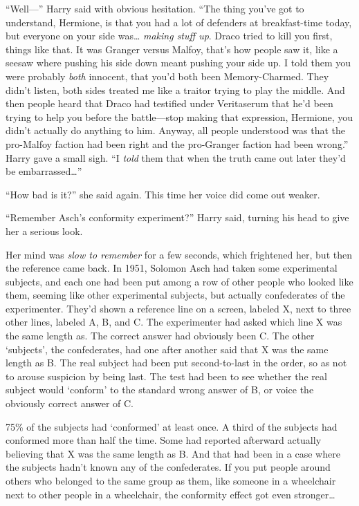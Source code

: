 ``Well---'' Harry said with obvious hesitation. ``The thing you've got
to understand, Hermione, is that you had a lot of defenders at
breakfast-time today, but everyone on your side was\ldots{} \emph{making
stuff up}. Draco tried to kill you first, things like that. It was
Granger versus Malfoy, that's how people saw it, like a seesaw where
pushing his side down meant pushing your side up. I told them you were
probably \emph{both} innocent, that you'd both been Memory-Charmed. They
didn't listen, both sides treated me like a traitor trying to play the
middle. And then people heard that Draco had testified under Veritaserum
that he'd been trying to help you before the battle---stop making that
expression, Hermione, you didn't actually do anything to him. Anyway,
all people understood was that the pro-Malfoy faction had been right and
the pro-Granger faction had been wrong.'' Harry gave a small sigh. ``I
\emph{told} them that when the truth came out later they'd be
embarrassed\ldots{}''

``How bad is it?'' she said again. This time her voice did come out
weaker.

``Remember Asch's conformity experiment?'' Harry said, turning his head
to give her a serious look.

Her mind was \emph{slow to remember} for a few seconds, which frightened
her, but then the reference came back. In 1951, Solomon Asch had taken
some experimental subjects, and each one had been put among a row of
other people who looked like them, seeming like other experimental
subjects, but actually confederates of the experimenter. They'd shown a
reference line on a screen, labeled X, next to three other lines,
labeled A, B, and C. The experimenter had asked which line X was the
same length as. The correct answer had obviously been C. The other
`subjects', the confederates, had one after another said that X was the
same length as B. The real subject had been put second-to-last in the
order, so as not to arouse suspicion by being last. The test had been to
see whether the real subject would `conform' to the standard wrong
answer of B, or voice the obviously correct answer of C.

75\% of the subjects had `conformed' at least once. A third of the
subjects had conformed more than half the time. Some had reported
afterward actually believing that X was the same length as B. And that
had been in a case where the subjects hadn't known any of the
confederates. If you put people around others who belonged to the same
group as them, like someone in a wheelchair next to other people in a
wheelchair, the conformity effect got even stronger\ldots{}

